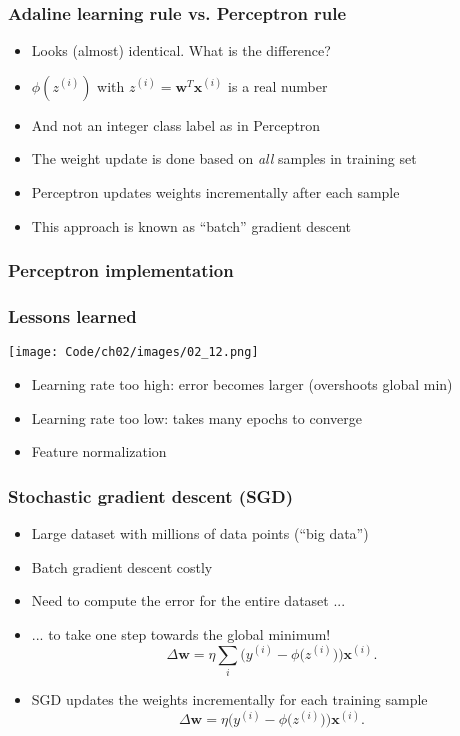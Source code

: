 \documentclass{beamer}
\begin{document}
\begin{frame}
  \frametitle{Adaline learning rule vs. Perceptron rule}
  \begin{itemize}
  \item Looks (almost) identical. What is the difference?
  \item $\phi(z^{(i)})$ with $z^{(i)} = \mathbf{w}^T \mathbf{x}^{(i)}$ is a real number
  \item And not an integer class label as in Perceptron
  \item The weight update is done based on \emph{all} samples in training set
  \item Perceptron updates weights incrementally after each sample
    \item This approach is known as ``batch'' gradient descent
  \end{itemize}
\end{frame}

\begin{frame}
  \frametitle{Perceptron implementation}
  \href{https://github.com/rasbt/python-machine-learning-book/blob/master/code/ch02/ch02.ipynb}{}
\end{frame}

\begin{frame}
  \frametitle{Lessons learned}
  \texttt{[image: Code/ch02/images/02\_12.png]}
  \begin{itemize}
  \item Learning rate too high: error becomes larger (overshoots global min)
  \item Learning rate too low: takes many epochs to converge
    \item Feature normalization
  \end{itemize}
\end{frame}

\begin{frame}
  \frametitle{Stochastic gradient descent (SGD)}
  \begin{itemize}
  \item Large dataset with millions of data points (``big data'')
  \item Batch gradient descent costly
  \item Need to compute the error for the entire dataset ...
  \item ... to take one step towards the global minimum!
    \[
    \Delta \mathbf{w} = \eta \sum_i \bigg( y^{(i)} - \phi \big( z^{(i)}\big) \bigg) \mathbf{x}^{(i)}.
    \]
  \item SGD updates the weights incrementally for each training sample
    \[
    \Delta \mathbf{w} = \eta  \bigg( y^{(i)} - \phi \big( z^{(i)}\big) \bigg) \mathbf{x}^{(i)}.
    \]
  \end{itemize}
\end{frame}
\end{document}
